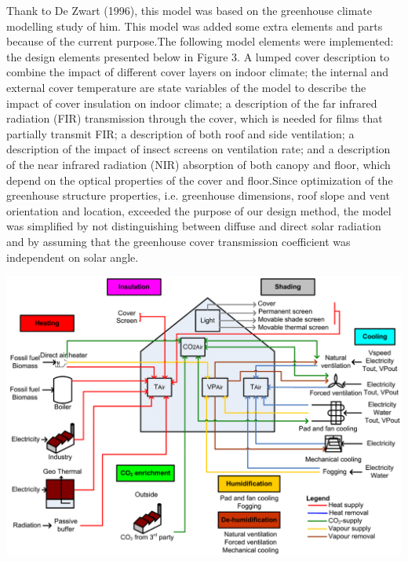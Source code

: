 \indent Thank to De Zwart (1996), this model was based on the greenhouse climate modelling study of him. This model was added some extra elements and parts because of the current purpose.The following model elements were implemented: the design elements presented below in Figure 3. A  lumped  cover  description  to  combine  the  impact  of different  cover  layers  on  indoor  climate;  the  internal  and  external  cover  temperature  are state variables of the model to describe the impact of cover insulation on indoor climate; a description  of  the  far  infrared  radiation  (FIR)  transmission  through  the  cover,  which  is needed for films that partially transmit FIR; a description of both roof and side ventilation; a  description  of  the  impact  of  insect  screens  on  ventilation  rate;  and  a  description  of  the near  infrared  radiation  (NIR)  absorption  of  both  canopy  and  floor,  which  depend  on  the optical  properties  of  the  cover  and  floor.Since optimization of the greenhouse structure properties, i.e. greenhouse dimensions, roof slope and vent orientation and location, exceeded the purpose of our design method,
the model was simplified by not distinguishing between diffuse and direct solar radiation and by assuming that the greenhouse cover transmission coefficient was independent on solar angle.
\begin{center}
    \includegraphics[width=14cm]{Image/Fi1.png}
\end{center}
